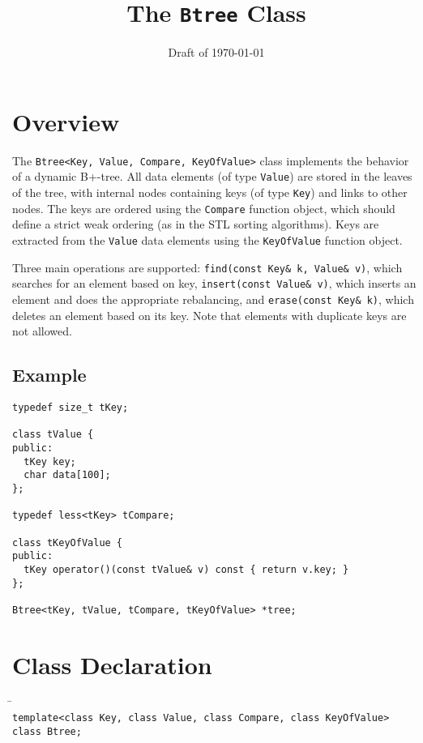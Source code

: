 \documentclass[11pt]{article}
\begin{document}
\title{\bf The {\tt Btree} Class}
\date{Draft of \today}
\author{}
\maketitle

\section{Overview}
\label{btree:overview}

The {\tt Btree<Key, Value, Compare, KeyOfValue>} class implements the behavior of a dynamic B+-tree. All data elements (of type {\tt Value}) are stored in the leaves of the tree, with internal nodes containing keys (of type {\tt Key}) and links to other nodes. The keys are ordered using the {\tt Compare} function object, which should define a strict weak ordering (as in the STL sorting algorithms). Keys are extracted from the {\tt Value} data elements using the {\tt KeyOfValue} function object.

Three main operations are supported: {\tt find(const Key\& k, Value\&
v)}, which searches for an element based on key, {\tt insert(const
Value\& v)}, which inserts an element and does the appropriate
rebalancing, and {\tt erase(const Key\& k)}, which deletes an element
based on its key. Note that elements with duplicate keys are not allowed.

\subsection{Example}
\begin{verbatim}
typedef size_t tKey;

class tValue {
public:
  tKey key;
  char data[100];
};

typedef less<tKey> tCompare;

class tKeyOfValue {
public:
  tKey operator()(const tValue& v) const { return v.key; }
};

Btree<tKey, tValue, tCompare, tKeyOfValue> *tree;
\end{verbatim}


\section{Class Declaration}

   \begin{tabbing}
   \hspace*{.3in} \= \hspace{.5in} \= \\

   \> {\tt template<class Key, class Value, class Compare, class KeyOfValue> class Btree;}
   \end{tabbing}
\end{document}
